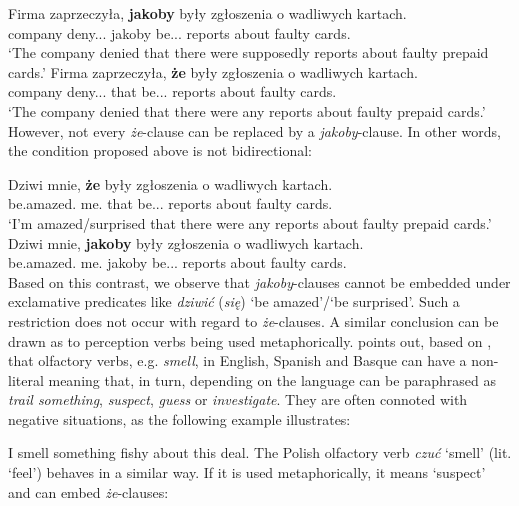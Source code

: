 \documentclass[output=paper
,modfonts
,nonflat]{langsci/langscibook}
\begin{document}
\ea \ea \gll		Firma zaprzeczyła, \textbf{jakoby} były zgłoszenia o wadliwych kartach. \label{kaffeec} \\
			company deny.{\lptcp}.{\sg}.{\fem} jakoby be.{\lptcp}.{\nvir}.{\pl} reports about faulty cards.{\LOC} \\
	\glt	`The company denied that there were supposedly reports about faulty prepaid cards.'
	\ex\gll			Firma zaprzeczyła, \textbf{że} były zgłoszenia o wadliwych kartach. \\
			company deny.{\lptcp}.{\sg}.{\fem} that be.{\lptcp}.{\nvir}.{\pl} reports about faulty cards.{\LOC} \\
	\glt	`The company denied that there were any reports about faulty prepaid cards.'
\z\z
However, not every \emph{że}-clause can be replaced by a \emph{jakoby}-clause. In other words, the condition proposed above is not bidirectional:

\ea \ea \gll		Dziwi mnie, \textbf{że} były zgłoszenia o wadliwych kartach. \\
			be.amazed.{\thirdperson}{\sg} me.{\acc} that be.{\lptcp}.{\nvir}.{\pl} reports about faulty cards.{\LOC} \\
	\glt		 `I'm amazed/surprised that there were any reports about faulty prepaid cards.'
	\ex\gll		 *Dziwi mnie, \textbf{jakoby} były zgłoszenia o wadliwych kartach. \\
			be.amazed.{\thirdperson}{\sg} me.{\acc} jakoby be.{\lptcp}.{\nvir}.{\pl} reports about faulty cards.{\LOC} \\
\z\z
Based on this contrast, we observe that \emph{jakoby}-clauses cannot be embedded under exclamative predicates like \emph{dziwić} (\emph{się})  `be amazed'\slash `be surprised'. Such a restriction does not occur with regard to  \emph{że}-clauses. A similar conclusion can be drawn as to perception verbs being used metaphorically. \textcite{Ibarretxe-Antunano1999} points out, based on \textcite{Sweetser1990}, that olfactory verbs, e.g. \emph{smell}, in English, Spanish and Basque can have a non-literal meaning that, in turn, depending on the language can be paraphrased as \emph{trail something}, \emph{suspect}, \emph{guess} or \emph{investigate}. They are often connoted with negative situations, as the following example illustrates:

\ea I smell something fishy about this deal.  \z
The Polish olfactory verb \emph{czuć} `smell' (lit. `feel') behaves in a similar way. If it is used metaphorically, it means `suspect' and can embed \emph{że}-clauses:
\end{document}
